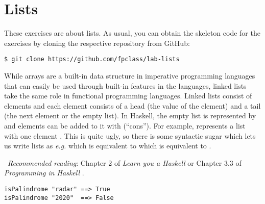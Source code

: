 \section{Lists} \label{sec:lab-lists}

These exercises are about lists. As usual, you can obtain the skeleton code for the exercises by cloning the respective repository from GitHub:
\begin{verbatim}
$ git clone https://github.com/fpclass/lab-lists
\end{verbatim}
While arrays are a built-in data structure in imperative programming languages that can easily be used through built-in features in the languages, linked lists take the same role in functional programming languages. Linked lists consist of elements and each element consists of a head (the value of the element) and a tail (the next element or the empty list). In Haskell, the empty list is represented by \haskellIn{[]} and elements can be added to it with \haskellIn{:} (``cons''). For example,  represents a list with one element . This is quite ugly, so there is some syntactic sugar which lets us write lists as \emph{e.g.} \haskellIn{[1,2,3]} which is equivalent to  which is equivalent to .

\makebox[0.5cm]{\faBook}~\emph{Recommended reading}: Chapter 2 of \emph{Learn you a Haskell} \citep{lipovaca2011learn} or Chapter 3.3 of \emph{Programming in Haskell} \citep{hutton2016programming}.

\taskLine 


\begin{verbatim}
isPalindrome "radar" ==> True 
isPalindrome "2020"  ==> False
\end{verbatim}

\taskLine 

